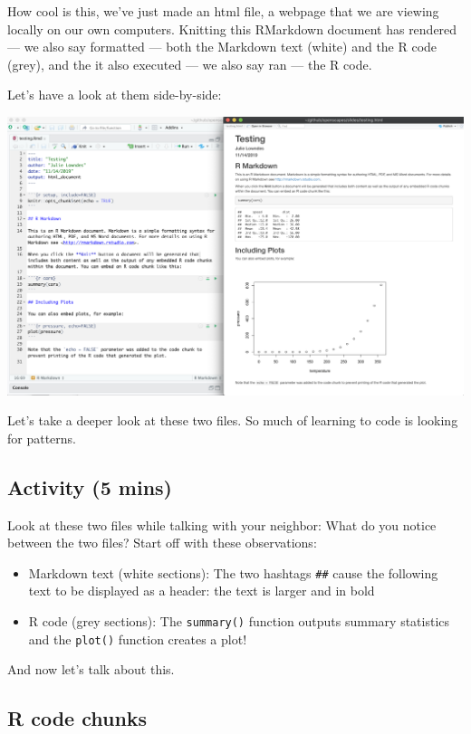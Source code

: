 \documentclass[]{book}
\providecommand{\tightlist}{%
  \setlength{\itemsep}{0pt}\setlength{\parskip}{0pt}}
\begin{document}
How cool is this, we've just made an html file, a webpage that we are viewing locally on our own computers. Knitting this RMarkdown document has rendered --- we also say formatted --- both the Markdown text (white) and the R code (grey), and the it also executed --- we also say ran --- the R code.

Let's have a look at them side-by-side:

\includegraphics[width=0.8\linewidth]{img/rmarkdown_side_by_side}

Let's take a deeper look at these two files. So much of learning to code is looking for patterns.

\hypertarget{activity-5-mins}{%
\subsection{Activity (5 mins)}\label{activity-5-mins}}

Look at these two files while talking with your neighbor: What do you notice between the two files? Start off with these observations:

\begin{itemize}
\tightlist
\item
  Markdown text (white sections): The two hashtags \texttt{\#\#} cause the following text to be displayed as a header: the text is larger and in bold
\item
  R code (grey sections): The \texttt{summary()} function outputs summary statistics and the \texttt{plot()} function creates a plot!
\end{itemize}

And now let's talk about this.

\hypertarget{r-code-chunks}{%
\subsection{R code chunks}\label{r-code-chunks}}
\end{document}
